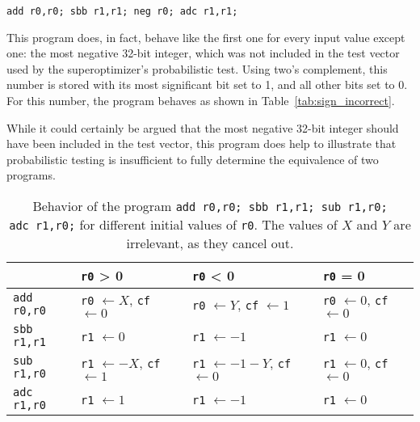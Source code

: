 \documentclass[a4paper,11pt]{kth-mag}
\renewcommand{\gets}{\leftarrow}
\begin{document}
\begin{verbatim}
add r0,r0; sbb r1,r1; neg r0; adc r1,r1;
\end{verbatim}

This program does, in fact, behave like the first one for every input value except one: the most negative 32-bit integer, which was not included in the test vector used by the superoptimizer's probabilistic test.
Using two's complement, this number is stored with its most significant bit set to 1, and all other bits set to 0.
For this number, the program behaves as shown in Table~\ref{tab:sign_incorrect}.

While it could certainly be argued that the most negative 32-bit integer should have been included in the test vector, this program does help to illustrate that probabilistic testing is insufficient to fully determine the equivalence of two programs.


\begin{table}
\centering
\tiny
\begin{tabular}{l|lll}
& \verb|r0| > 0
& \verb|r0| < 0
& \verb|r0| = 0 \\
\hline
\verb|add r0,r0|
& \verb|r0| $\gets X$, \verb|cf| $\gets 0$ %
& \verb|r0| $\gets Y$, \verb|cf| $\gets 1$
& \verb|r0| $\gets 0$, \verb|cf| $\gets 0$ \\
\verb|sbb r1,r1|
& \verb|r1| $\gets 0$
& \verb|r1| $\gets -1$
& \verb|r1| $\gets 0$ \\
\verb|sub r1,r0|
& \verb|r1| $\gets -X$, \verb|cf| $\gets 1$
& \verb|r1| $\gets -1-Y$, \verb|cf| $\gets 0$ %
& \verb|r1| $\gets 0$, \verb|cf| $\gets 0$ \\
\verb|adc r1,r0|
& \verb|r1| $\gets 1$
& \verb|r1| $\gets -1$
& \verb|r1| $\gets 0$ \\
\end{tabular}
\caption{Behavior of the program \texttt{add~r0,r0; sbb~r1,r1; sub~r1,r0; adc~r1,r0;} for different initial values of \texttt{r0}. The values of $X$ and $Y$ are irrelevant, as they cancel out.}
\label{tab:sign_correct}
\end{table}
\end{document}
